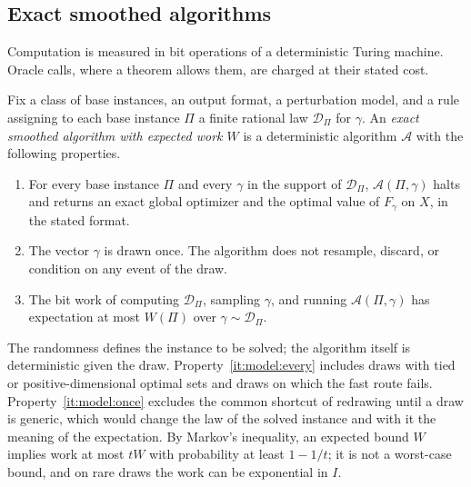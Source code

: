 \subsection{Exact smoothed algorithms}\label{sec:model:algorithms}

Computation is measured in bit operations of a deterministic Turing
machine. Oracle calls, where a theorem allows them, are charged at their
stated cost.

\begin{definition}\label{def:model:algorithm}
Fix a class of base instances, an output format, a perturbation model, and a
rule assigning to each base instance $\Pi$ a finite rational law
$\mathcal D_\Pi$ for $\gamma$. An \emph{exact smoothed algorithm with expected
work $W$} is a deterministic algorithm $\mathcal A$ with the following
properties.
\begin{enumerate}[label=(\roman*)]
\item\label{it:model:every} For every base instance $\Pi$ and every $\gamma$
in the support of $\mathcal D_\Pi$, $\mathcal A(\Pi,\gamma)$ halts and
returns an exact global optimizer and the optimal value of $F_\gamma$ on $X$,
in the stated format.
\item\label{it:model:once} The vector $\gamma$ is drawn once. The algorithm
does not resample, discard, or condition on any event of the draw.
\item\label{it:model:expect} The bit work of computing $\mathcal D_\Pi$,
sampling $\gamma$, and running $\mathcal A(\Pi,\gamma)$ has expectation at
most $W(\Pi)$ over $\gamma\sim\mathcal D_\Pi$.
\end{enumerate}
\end{definition}

The randomness defines the instance to be solved; the algorithm itself is
deterministic given the draw. Property~\ref{it:model:every} includes draws
with tied or positive-dimensional optimal sets and draws on which the fast
route fails. Property~\ref{it:model:once} excludes the common shortcut of
redrawing until a draw is generic, which would change the law of the solved
instance and with it the meaning of the expectation. By Markov's
inequality, an expected bound $W$ implies work at most $tW$ with
probability at least $1-1/t$; it is not a worst-case bound, and on rare
draws the work can be exponential in $I$.

